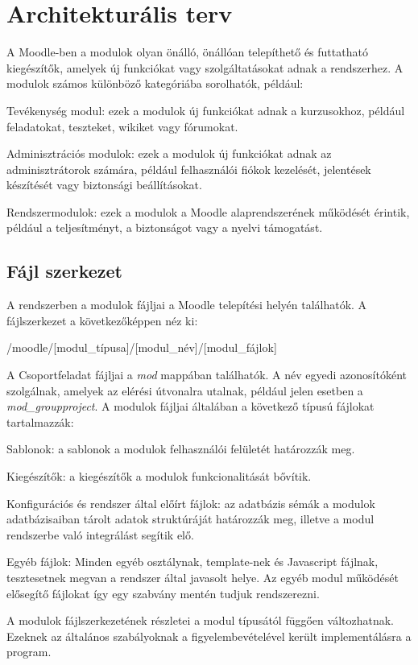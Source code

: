 \section{Architekturális terv}
A Moodle-ben a modulok olyan önálló, önállóan telepíthető és futtatható kiegészítők, amelyek új funkciókat vagy szolgáltatásokat adnak a rendszerhez. A modulok számos különböző kategóriába sorolhatók, például:

\begin{compactitem}
    \item Tevékenység modul: ezek a modulok új funkciókat adnak a kurzusokhoz, például feladatokat, teszteket, wikiket vagy fórumokat.
    \item Adminisztrációs modulok: ezek a modulok új funkciókat adnak az adminisztrátorok számára, például felhasználói fiókok kezelését, jelentések készítését vagy biztonsági beállításokat.
    \item Rendszermodulok: ezek a modulok a Moodle alaprendszerének működését érintik, például a teljesítményt, a biztonságot vagy a nyelvi támogatást.
\end{compactitem}

\subsection{Fájl szerkezet}

A rendszerben a modulok fájljai a Moodle telepítési helyén találhatók. A fájlszerkezet a következőképpen néz ki:

/moodle/[modul\_típusa]/[modul\_név]/[modul\_fájlok]

A Csoportfeladat fájljai a \textit{mod} mappában találhatók. A név egyedi azonosítóként szolgálnak, amelyek az elérési útvonalra utalnak, például jelen esetben a  \textit{mod\_groupproject}. A modulok fájljai általában a következő típusú fájlokat tartalmazzák:
\begin{compactitem}
    \item Sablonok: a sablonok a modulok felhasználói felületét határozzák meg.
    \item Kiegészítők: a kiegészítők a modulok funkcionalitását bővítik.
    \item Konfigurációs és rendszer által előírt fájlok: az adatbázis sémák a modulok adatbázisaiban tárolt adatok struktúráját határozzák meg, illetve a modul rendszerbe való integrálást segítik elő.
    \item Egyéb fájlok: Minden egyéb osztálynak, template-nek és Javascript fájlnak, tesztesetnek megvan a rendszer által javasolt helye. Az egyéb modul működését elősegítő fájlokat így egy szabvány mentén tudjuk rendszerezni.
\end{compactitem}
A modulok fájlszerkezetének részletei a modul típusától függően változhatnak. Ezeknek az általános szabályoknak a figyelembevételével került implementálásra a program.

